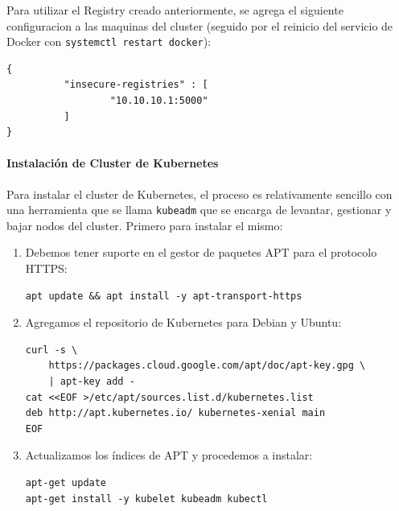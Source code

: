 Para utilizar el Registry creado anteriormente, se agrega el siguiente configuracion a las maquinas del cluster (seguido por el reinicio del servicio de Docker con \texttt{systemctl restart docker}):
\begin{lstlisting}
{
          "insecure-registries" : [
                  "10.10.10.1:5000"
          ]
}
\end{lstlisting}

\paragraph{Instalación de Cluster de Kubernetes}
Para instalar el cluster de Kubernetes, el proceso es relativamente sencillo con una herramienta que se llama \texttt{kubeadm} que se encarga de levantar, gestionar y bajar nodos del cluster. Primero para instalar el mismo:
\begin{enumerate}
	\item Debemos tener suporte en el gestor de paquetes APT para el protocolo HTTPS:
    \begin{lstlisting}
apt update && apt install -y apt-transport-https
    \end{lstlisting}	
	\item Agregamos el repositorio de Kubernetes para Debian y Ubuntu:
    \begin{lstlisting}
curl -s \
	https://packages.cloud.google.com/apt/doc/apt-key.gpg \
	| apt-key add -
cat <<EOF >/etc/apt/sources.list.d/kubernetes.list
deb http://apt.kubernetes.io/ kubernetes-xenial main
EOF
    \end{lstlisting}
    \item Actualizamos los índices de APT y procedemos a instalar:
    \begin{lstlisting}
apt-get update
apt-get install -y kubelet kubeadm kubectl
    \end{lstlisting}
\end{enumerate}
\citep{kubernetes-install-kubeadm}


